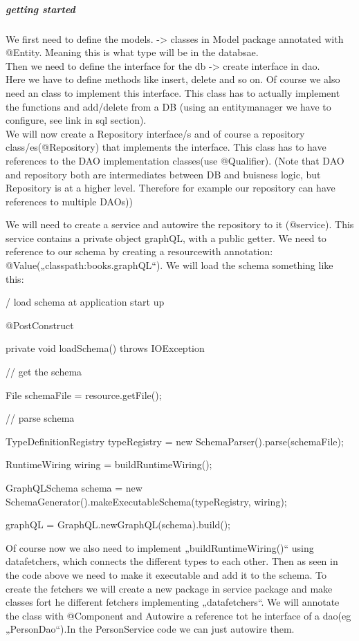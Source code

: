 \begin{itemize}
        \subparagraph{getting started}
        We first need to define the models. -> classes in Model package annotated with @Entity. Meaning this is what type will be in the databsae.\\
        Then we need to define the interface for the db -> create interface in dao.\\
        Here we have to define methods like insert, delete and so on. Of course we also need an class to implement this interface. This class has to actually implement the functions and add/delete from a DB
        (using an entitymanager we have to configure, see link in sql section).\\
        We will now create a Repository interface/s and of course a repository class/es(@Repository) that implements the interface. This class has to have references to the 
        DAO implementation classes(use @Qualifier). (Note that DAO and repository both are intermediates between DB and buisness logic, but Repository is at a higher level.
        Therefore for example our repository can have references to multiple DAOs))

        We will need to create a service and autowire the repository to it (@service). This service contains a private object graphQL, with a public getter. 
        We need to reference to our schema by creating a resourcewith annotation: @Value(„classpath:books.graphQL“). We will load the schema something like this:


        / load schema at application start up
        
        @PostConstruct
        
        private void loadSchema() throws IOException {        
        
        // get the schema
        
        File schemaFile = resource.getFile();
        
        // parse schema
        
        TypeDefinitionRegistry typeRegistry = new SchemaParser().parse(schemaFile);
        
        RuntimeWiring wiring = buildRuntimeWiring();
        
        
        GraphQLSchema schema = new SchemaGenerator().makeExecutableSchema(typeRegistry, wiring);
        
        graphQL = GraphQL.newGraphQL(schema).build();
        
        }
        Of course now we also need to implement „buildRuntimeWiring()“ using datafetchers, which connects the different types to each other.
        Then as seen in the code above we need to make it executable and add it to the schema.
        To create the fetchers we will create a new package in service package and make classes fort he different fetchers implementing „datafetchers“.
        We will annotate the class with @Component and Autowire a reference tot he interface of a dao(eg „PersonDao“).In the PersonService code we can just autowire them.
        

\end{itemize}
